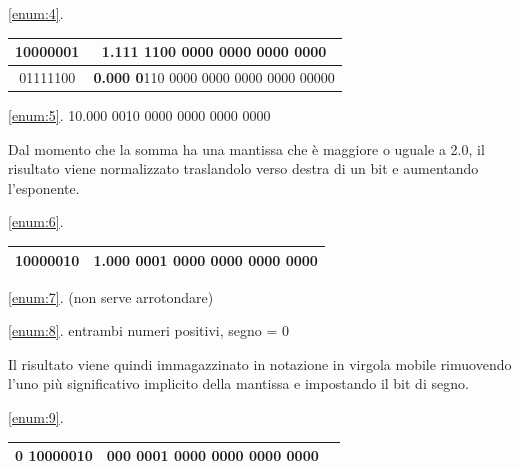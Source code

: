 \begin{example}[Addizione]
\begin{center}
    \ref{enum:4}.\hspace{1cm}
    \begin{tabular}{|c|c|}
        \hline 10000001 & 1.111 1100 0000 0000 0000 0000\\\hline
        \hline 01111100 & \textbf{0.000 0}110 0000 0000 0000 0000 00000\\\hline
    \end{tabular}
    \end{center}
    \begin{center}
    \ref{enum:5}.\hspace{1cm} 10.000 0010 0000 0000 0000 0000
    \end{center}
    Dal momento che la somma ha una mantissa che è maggiore o uguale a 2.0, il risultato viene normalizzato traslandolo verso destra di un bit e aumentando l’esponente.
    \begin{center}
    \ref{enum:6}.\hspace{1cm}
    \begin{tabular}{|c|c|}
        \hline 100000\textbf{10} & \textbf{1.}000 0001 0000 0000 0000 0000\\\hline
    \end{tabular}
    \end{center}
    \begin{center}
    \ref{enum:7}.\hspace{1cm}
    (non serve arrotondare)
    \end{center}
    \begin{center}
    \ref{enum:8}.\hspace{1cm}
    entrambi numeri positivi, segno = 0
    \end{center}
    Il risultato viene quindi immagazzinato in notazione in virgola mobile rimuovendo l’uno più significativo implicito della mantissa e impostando il bit di segno.
    \begin{center}
    \ref{enum:9}.\hspace{1cm}
    \begin{tabular}{|c|c|c|}
        \hline 0 10000010 & 000 0001 0000 0000 0000 0000\\\hline
    \end{tabular}
    \end{center}
\end{example}


